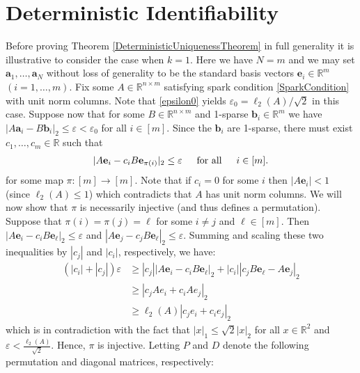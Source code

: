 \documentclass[journal, onecolumn]{IEEEtran}
\begin{document}
 

\section{Deterministic Identifiability}\label{DUT}


Before proving Theorem \ref{DeterministicUniquenessTheorem} in full generality it is illustrative to consider the case when $k=1$. Here we have $N = m$ and we may set $\mathbf{a}_1, \ldots, \mathbf{a}_N$ without loss of generality to be the standard basis vectors $\mathbf{e}_i \in \mathbb{R}^m$ $(i = 1, \ldots, m)$. Fix some $A \in \mathbb{R}^{n \times m}$ satisfying spark condition \eqref{SparkCondition} with unit norm columns. Note that \eqref{epsilon0} yields $\varepsilon _0 = \ell_2(A)/\sqrt{2}$ in this case. Suppose now that for some $B \in \mathbb{R}^{n \times m}$ and 1-sparse $\mathbf{b}_i \in \mathbb{R}^m$ we have  $|A\mathbf{a}_i - B\mathbf{b}_i|_2 \leq \varepsilon < \varepsilon_0$ for all $i \in [m]$. Since the $\mathbf{b}_i$ are 1-sparse, there must exist $c_1, \ldots, c_m \in \mathbb{R}$ such that 
\begin{align}\label{1D}
|A\mathbf{e}_i - c_iB\mathbf{e}_{\pi(i)}|_2 \leq \varepsilon \indent \text{for all} \indent i \in [m].
\end{align}
for some map $\pi: [m] \to [m]$. 
Note that if $c_i = 0$ for some $i$ then $|A\mathbf{e}_i| < 1$ (since $\ell_2(A) \leq 1$) which contradicts that $A$ has unit norm columns. We will now show that $\pi$ is necessarily injective (and thus defines a permutation). Suppose that $\pi(i) = \pi(j) = \ell$ for some $i \neq j$ and $\ell \in [m]$. Then $|A\mathbf{e}_i - c_iB\mathbf{e}_{\ell}|_2  \leq \varepsilon$ and $|A\mathbf{e}_j - c_jB\mathbf{e}_{\ell}|_2 \leq \varepsilon$. Summing and scaling these two inequalities by $|c_j|$ and $|c_i|$, respectively, we have:
\begin{align*}
(|c_i| + |c_j|) \varepsilon
&\geq |c_j||A\mathbf{e}_i - c_iB\mathbf{e}_{\ell}|_2 + |c_i||c_jB\mathbf{e}_{\ell} - A\mathbf{e}_j|_2 \\
&\geq |c_jAe_i + c_iAe_j|_2 \\
&\geq \ell_2(A)|c_je_i + c_ie_j|_2
\end{align*}
%
which is in contradiction with the fact that $|x|_1 \leq \sqrt{2}|x|_2$ for all $x \in \mathbb{R}^2$ and $\varepsilon < \frac{\ell_2(A)}{\sqrt{2}}$. Hence, $\pi$ is injective. Letting $P$ and $D$ denote the following permutation and diagonal matrices, respectively:
\end{document}
